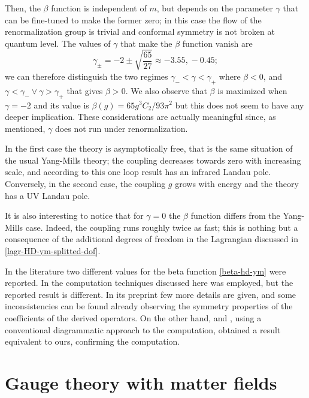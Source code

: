 Then, the $\beta$ function is independent of $m$, but depends on the parameter $\gamma$ that can be fine-tuned to make the former zero; in this case the flow of the renormalization group is trivial and conformal symmetry is not broken at quantum level. The values of $\gamma$ that make the $\beta$ function vanish are 
\begin{equation}
\gamma_{\pm} = -2 \pm \sqrt{\frac{65}{27}} \approx -3.55  \text{,}\ -0.45;
\end{equation}
we can therefore distinguish the two regimes
\( 
	\gamma_- < \gamma < \gamma_+
\)
where $\beta < 0$, and 
\(
\gamma < \gamma_- \vee \gamma > \gamma_+
\)
that gives
\(
\beta > 0
\). We also observe that $\beta$ is maximized when \( \gamma = -2 \) and its value is
\(
\beta(g)  =  {65 g^3 C_2} / {93 \pi^2}  
\)
but this does not seem to have any deeper implication.
These considerations are actually meaningful since, as mentioned, $\gamma$ does not run under renormalization.


In the first case the theory is asymptotically free, that is the same situation of the usual Yang-Mills theory; the coupling decreases towards zero with increasing scale, and according to this one loop result has an infrared Landau pole. Conversely, in  the second case, the coupling $g$ grows with energy and the theory has a UV Landau pole.

It is also interesting to notice that for $\gamma = 0 $ the $\beta$ function differs from the Yang-Mills case. Indeed, the coupling runs roughly twice as fast; this is nothing but a consequence of the additional degrees of freedom in the Lagrangian discussed in \eqref{lagr-HD-ym-splitted-dof}.

In the literature two different values for the beta function \eqref{beta-hd-ym} were reported. In \cite{Fradkin:1981iu} the computation techniques discussed here was employed, but the reported result is different. In its preprint \cite{Fradkin:preprint}  few more details are given, and some inconsistencies can be found already observing the symmetry properties of the coefficients of the derived operators.
On the other hand, \cite{Grinstein:2008qq} and \cite{Schuster}, using a conventional diagrammatic approach to the computation, obtained a result equivalent to ours, confirming the computation.



\section{Gauge theory with matter fields}


